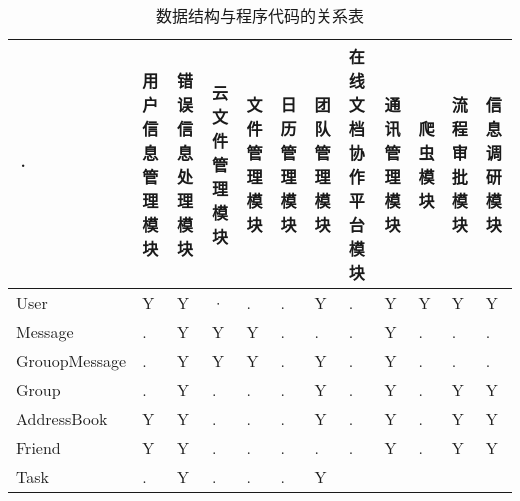 {\color{red}
        \begin{table}[htbp]
            \centering
            \caption{数据结构与程序代码的关系表}
            \label{tab:datastructure-module}
            \begin{tabular}{|p{6.3em}|p{2em}|p{2em}|p{2em}|p{2em}|p{2em}|
                            p{2em}|p{2em}|p{2em}|p{2em}|p{2em}|p{2em}|}
                \hline %
            ·   & 用户信息管理模块      & 错误信息处理模块  & 云文件管理模块 
                & 文件管理模块          & 日历管理模块      & 团队管理模块      
                & 在线文档协作平台模块  & 通讯管理模块      &
                爬虫模块
                & 流程审批模块          & 信息调研模块
                \\
                \hline
                User                & Y   & Y     & · 
                                    & .   & .     & Y
                                    & .   & Y     & Y
                                    & Y   & Y     \\
                \hline
                Message             & .   & Y     & Y 
                                    & Y   & .     & .
                                    & .   & Y     & .
                                    & .   & .     \\
                \hline
                GrouopMessage       & .   & Y     & Y 
                                    & Y   & .     & Y
                                    & .   & Y     & .
                                    & .   & .     \\
                \hline
                Group               & .   & Y     & . 
                                    & .   & .     & Y
                                    & .   & Y     & .
                                    & Y   & Y     \\
                \hline
                AddressBook         & Y   & Y     & . 
                                    & .   & .     & Y
                                    & .   & Y     & .
                                    & Y   & Y     \\
                \hline
                Friend              & Y   & Y     & . 
                                    & .   & .     & .
                                    & .   & Y     & .
                                    & Y   & Y     \\
                \hline
                Task                & .   & Y     & . 
                                    & .   & .     & Y

\end{tabular}
\end{table}}
